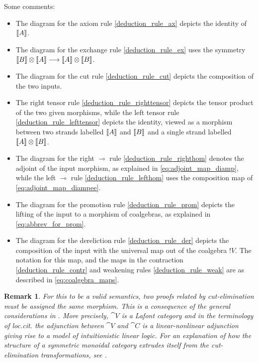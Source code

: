 \documentclass[english,letter paper,12pt,reqno]{article}
\theoremstyle{example}
\newtheorem{remark}[theorem]{Remark}
\numberwithin{equation}{section}
\begin{document}
Some comments:
\begin{itemize}
\item The diagram for the axiom rule \eqref{deduction_rule_ax} depicts the identity of $\llbracket A \rrbracket$.
\item The diagram for the exchange rule \eqref{deduction_rule_ex} uses the symmetry $\llbracket B \rrbracket \otimes \llbracket A \rrbracket \longrightarrow \llbracket A \rrbracket \otimes \llbracket B \rrbracket$.
\item The diagram for the cut rule \eqref{deduction_rule_cut} depicts the composition of the two inputs.
\item The right tensor rule \eqref{deduction_rule_righttensor} depicts the tensor product of the two given morphisms, while the left tensor rule \eqref{deduction_rule_lefttensor} depicts the identity, viewed as a morphism between two strands labelled $\llbracket A \rrbracket$ and $\llbracket B \rrbracket$ and a single strand labelled $\llbracket A \rrbracket \otimes \llbracket B \rrbracket$.
\item The diagram for the right $\multimap$ rule \eqref{deduction_rule_righthom} denotes the adjoint of the input morphism, as explained in \eqref{eq:adjoint_map_diamp}, while the left $\multimap$ rule \eqref{deduction_rule_lefthom} uses the composition map of \eqref{eq:adjoint_map_diampee}.
\item The diagram for the promotion rule \eqref{deduction_rule_prom} depicts the lifting of the input to a morphism of coalgebras, as explained in \eqref{eq:abbrev_for_prom}.
\item The diagram for the dereliction rule \eqref{deduction_rule_der} depicts the composition of the input with the universal map out of the coalgebra ${!} V$. The notation for this map, and the maps in the contraction \eqref{deduction_rule_contr} and weakening rules \eqref{deduction_rule_weak} are as described in \eqref{eq:coalgebra_maps}.
\end{itemize}

\begin{remark} For this to be a valid semantics, two proofs related by cut-elimination must be assigned the same morphism. This is a consequence of the general considerations in \cite[\S 7]{mellies}. More precisely, $\cat{V}$ is a Lafont category \cite[\S 7.2]{mellies} and in the terminology of \emph{loc.cit.} the adjunction between $\cat{V}$ and $\cat{C}$ is a linear-nonlinear adjunction giving rise to a model of intuitionistic linear logic. For an explanation of how the structure of a symmetric monoidal category extrudes itself from the cut-elimination transformations, see \cite[\S 2]{mellies}.
\end{remark}
\end{document}
